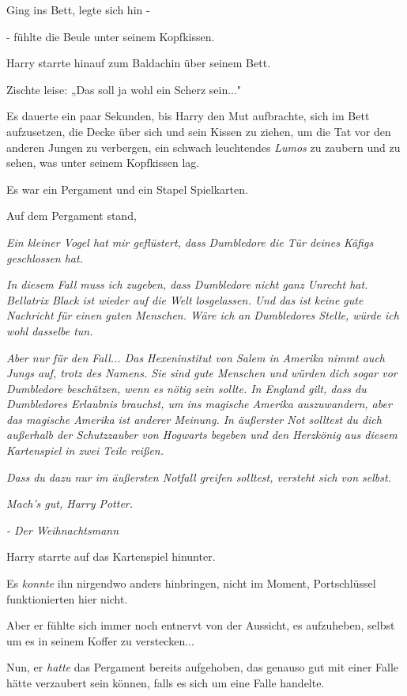 {Ging ins Bett, legte sich hin -

- fühlte die Beule unter seinem Kopfkissen.

Harry starrte hinauf zum Baldachin über seinem Bett.

Zischte leise: „Das soll ja wohl ein Scherz sein..."

Es dauerte ein paar Sekunden, bis Harry den Mut aufbrachte, sich im Bett aufzusetzen, die Decke über sich und sein Kissen zu ziehen, um die Tat vor den anderen Jungen zu verbergen, ein schwach leuchtendes \emph{Lumos} zu zaubern und zu sehen, was unter seinem Kopfkissen lag.

Es war ein Pergament und ein Stapel Spielkarten.

Auf dem Pergament stand,

\emph{\emph{Ein kleiner Vogel hat mir geflüstert, dass Dumbledore die Tür deines Käfigs geschlossen hat.}}

\emph{\emph{In diesem Fall muss ich zugeben, dass Dumbledore nicht ganz Unrecht hat. Bellatrix Black ist wieder auf die Welt losgelassen. Und das ist keine gute Nachricht für einen guten Menschen. Wäre ich an Dumbledores Stelle, würde ich wohl dasselbe tun.}}

\emph{\emph{Aber nur für den Fall... Das Hexeninstitut von Salem in Amerika nimmt auch Jungs auf, trotz des Namens. Sie sind gute Menschen und würden dich sogar vor Dumbledore beschützen, wenn es nötig sein sollte. In England gilt, dass} \emph{du} \emph{Dumbledores Erlaubnis brauchst, um ins magische Amerika auszuwandern, aber das magische Amerika ist anderer Meinung. In} \emph{äußerster Not} \emph{solltest du} \emph{dich außerhalb der} \emph{Schutzzauber} \emph{von Hogwarts begeben und den Herzkönig aus diesem Kartenspiel in zwei Teile reißen.}}

\emph{\emph{Dass du dazu nur im äußersten Notfall greifen solltest, versteht sich von selbst.}}

\emph{\emph{Mach's gut, Harry Potter.}}

\emph{\emph{- Der Weihnachtsmann}}

Harry starrte auf das Kartenspiel hinunter.

Es \emph{konnte} ihn nirgendwo anders hinbringen, nicht im Moment, Portschlüssel funktionierten hier nicht.

Aber er fühlte sich immer noch entnervt von der Aussicht, es aufzuheben, selbst um es in seinem Koffer zu verstecken...

Nun, er \emph{hatte} das Pergament bereits aufgehoben, das genauso gut mit einer Falle hätte verzaubert sein können, falls es sich um eine Falle handelte.

}
